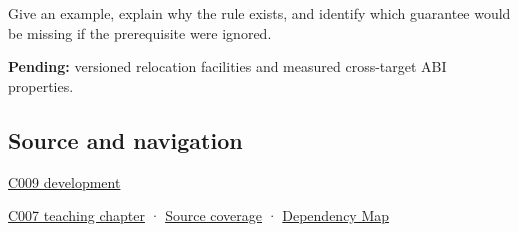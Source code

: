 Give an example, explain why the rule exists, and identify which guarantee would be missing if the prerequisite were ignored.

\textbf{Pending:} versioned relocation facilities and measured cross-target ABI properties.

\subsection{Source and navigation}\label{appendix-958870a64c53-source-and-navigation}

\hyperref[appendix-fd090d982a15-m009---parts-127-147]{C009 development}

\hyperref[01-foundations-i-ch003-bringing-the-object-model-back-to-bytes]{C007 teaching chapter} · \hyperref[appendix-fd090d982a15-m007---parts-101-112]{Source coverage} · \hyperref[appendix-4ad47bdd269a]{Dependency Map}
